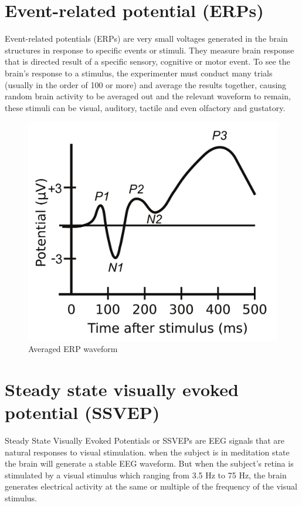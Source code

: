 \section{Event-related potential (ERPs)}

\hspace{1.5cm} Event-related potentials (ERPs) are very small voltages generated in the brain structures in response to specific events or stimuli. They measure brain response that is directed result of a specific sensory, cognitive or motor event. To see the brain's response to a stimulus, the experimenter must conduct many trials (usually in the order of 100 or more) and average the results together, causing random brain activity to be averaged out and the relevant waveform to remain, these stimuli can be visual, auditory, tactile and even olfactory and gustatory.


\begin{figure}[ht]
	\centering
	\includegraphics[scale = 0.3]{chapter3/32.pdf}
	\caption{Averaged ERP waveform}
\end{figure}

\newpage
\section{Steady state visually evoked potential (SSVEP)}

\hspace{1.5cm}  Steady State Visually Evoked Potentials or SSVEPs are EEG signals that are natural responses to visual stimulation. when the subject is in meditation state the brain will generate a stable EEG waveform. But when the subject's retina is stimulated by a visual stimulus which ranging from 3.5 Hz to 75 Hz, the brain generates electrical activity at the same or multiple of the frequency of the visual stimulus.\par

